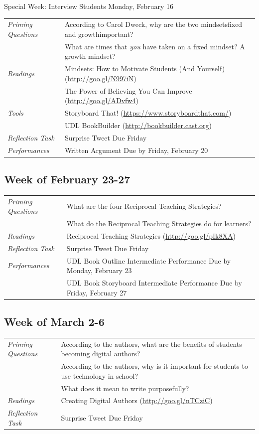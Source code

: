 \documentclass{tufte-handout}
\newcommand{\tabpq}{\faQuestionSign\medspace\textit{Priming Questions}}
\newcommand{\tabread}{\faBook\medspace\textit{Readings}}
\newcommand{\tabtools}{\faWrench\medspace\textit{Tools}}
\newcommand{\tabtweet}{\faLightbulb\medspace\textit{Reflection Task} & Surprise Tweet Due Friday \\}
\newcommand{\tabperformance}{\faTasks\medspace\textit{Performances}}
\newenvironment{tabsched}
	{\small
	\begin{tabular}{p{1.5in}p{5in}}
	\toprule}
	{\bottomrule
	\end{tabular}
	\normalsize}
\newenvironment{specweek}
	{\begin{center}
		\fontseries{b} \faBullhorn \medspace Special Week: }
		{\medspace \faBullhorn \fontseries{m}
	\end{center}}
\begin{document}
\begin{fullwidth}
\begin{specweek}Interview Students Monday, February 16\end{specweek}

\begin{tabsched}
	\tabpq & According to Carol Dweck, why are the two mindsets\textemdash{}fixed and growth\textemdash{}important? \\
	& What are times that \emph{you} have taken on a fixed mindset? A growth mindset? \\
	\midrule
	\tabread & Mindsets: How to Motivate Students (And Yourself) (\url{http://goo.gl/N997iN}) \\
	& The Power of Believing You Can Improve (\url{http://goo.gl/ADvfw4}) \\
	\midrule
	\tabtools & Storyboard That! (\url{https://www.storyboardthat.com/}) \\
	& UDL BookBuilder (\url{http://bookbuilder.cast.org}) \\
	\midrule
	\tabtweet
	\midrule
	\tabperformance & Written Argument Due by Friday, February 20 \\
\end{tabsched}

\subsection{Week of February 23-27}

\begin{tabsched}
	\tabpq & What are the four Reciprocal Teaching Strategies? \\
	& What do the Reciprocal Teaching Strategies do for learners? \\
	\midrule
	\tabread & Reciprocal Teaching Strategies (\url{http://goo.gl/pIk8XA}) \\
	\midrule
	\tabtweet
	\midrule
	\tabperformance & UDL Book Outline Intermediate Performance Due by Monday, February 23 \\
	& UDL Book Storyboard Intermediate Performance Due by Friday, February 27 \\

\end{tabsched}

\subsection{Week of March 2-6}

\begin{tabsched}
	\tabpq & According to the authors, what are the benefits of students becoming digital authors? \\
	& According to the authors, why is it important for students to use technology in school? \\
	& What does it mean to write purposefully? \\
	\midrule
	\tabread & Creating Digital Authors (\url{http://goo.gl/nTCziC}) \\
	\midrule
	\tabtweet
\end{tabsched}


\end{fullwidth}
\end{document}
